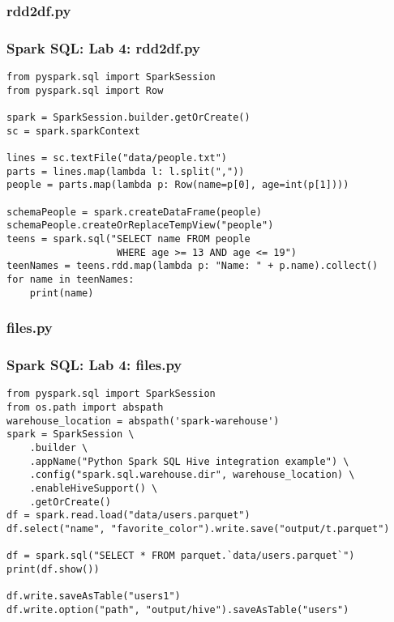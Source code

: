 \documentclass{beamer}
\begin{document}
\subsubsection{rdd2df.py}
\begin{frame}[fragile]
  \frametitle{Spark SQL: Lab 4: rdd2df.py}
{\small
{\color{mycolorcode}
\begin{verbatim}
from pyspark.sql import SparkSession
from pyspark.sql import Row

spark = SparkSession.builder.getOrCreate()
sc = spark.sparkContext

lines = sc.textFile("data/people.txt")
parts = lines.map(lambda l: l.split(","))
people = parts.map(lambda p: Row(name=p[0], age=int(p[1])))

schemaPeople = spark.createDataFrame(people)
schemaPeople.createOrReplaceTempView("people")
teens = spark.sql("SELECT name FROM people 
                   WHERE age >= 13 AND age <= 19")
teenNames = teens.rdd.map(lambda p: "Name: " + p.name).collect()
for name in teenNames:
    print(name)
\end{verbatim}
}
}
\end{frame}

\subsubsection{files.py}
\begin{frame}[fragile]
  \frametitle{Spark SQL: Lab 4: files.py}
{\small
{\color{mycolorcode}
\begin{verbatim}
from pyspark.sql import SparkSession
from os.path import abspath
warehouse_location = abspath('spark-warehouse')
spark = SparkSession \
    .builder \
    .appName("Python Spark SQL Hive integration example") \
    .config("spark.sql.warehouse.dir", warehouse_location) \
    .enableHiveSupport() \
    .getOrCreate()
df = spark.read.load("data/users.parquet")
df.select("name", "favorite_color").write.save("output/t.parquet")

df = spark.sql("SELECT * FROM parquet.`data/users.parquet`")
print(df.show())

df.write.saveAsTable("users1")
df.write.option("path", "output/hive").saveAsTable("users")
\end{verbatim}
}
}
\end{frame}
\end{document}
